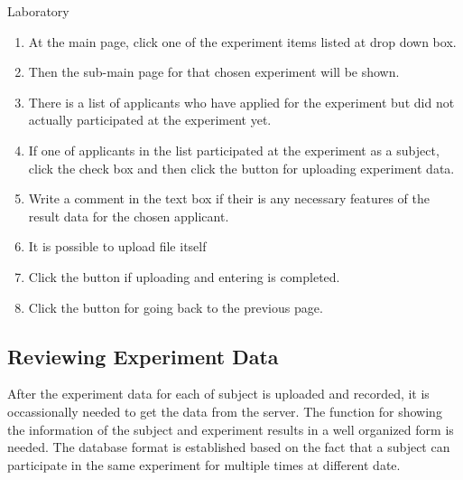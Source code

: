 \documentclass[letterpaper, 10 pt, conference]{ieeeconf}  %
\begin{document}
Laboratory\\

\begin{enumerate}
     \item At the main page, click one of the experiment items listed at drop down box.
    \item Then the sub-main page for that chosen experiment will be shown.
\item There is a list of applicants who have applied for the experiment but did not actually participated at the experiment yet. 
\item If one of applicants in the list participated at the experiment as a subject, click the check box and then click the button for uploading experiment data.
\item Write a comment in the text box if their is any necessary features of the result data for the chosen applicant.
\item It is possible to upload file itself
\item Click the button if uploading and entering is completed.
\item Click the button for going back to the previous page.
    
\end{enumerate}


\subsection{Reviewing Experiment Data}
After the experiment data for each of subject is uploaded and recorded, it is occassionally needed to get the data from the server. The function for showing the information of the subject and experiment results in a well organized form is needed. The database format is established based on the fact that a subject can participate in the same experiment for multiple times at different date.\\
\end{document}
